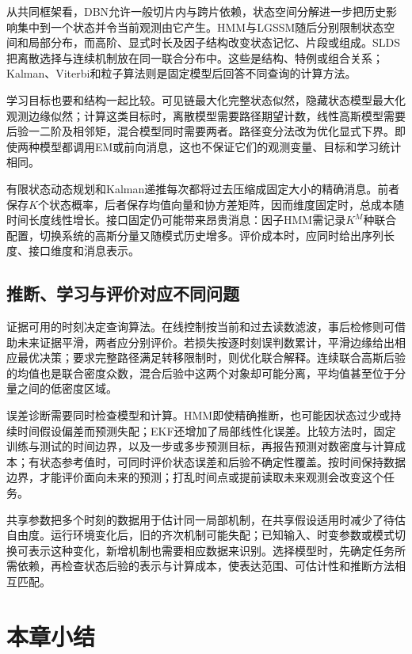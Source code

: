从共同框架看，DBN允许一般切片内与跨片依赖，状态空间分解进一步把历史影响集中到一个状态并令当前观测由它产生。HMM与LGSSM随后分别限制状态空间和局部分布，而高阶、显式时长及因子结构改变状态记忆、片段或组成。SLDS把离散选择与连续机制放在同一联合分布中。这些是结构、特例或组合关系；Kalman、Viterbi和粒子算法则是固定模型后回答不同查询的计算方法。

学习目标也要和结构一起比较。可见链最大化完整状态似然，隐藏状态模型最大化观测边缘似然；计算这类目标时，离散模型需要路径期望计数，线性高斯模型需要后验一二阶及相邻矩，混合模型同时需要两者。路径变分法改为优化显式下界。即使两种模型都调用EM或前向消息，这也不保证它们的观测变量、目标和学习统计相同。

有限状态动态规划和Kalman递推每次都将过去压缩成固定大小的精确消息。前者保存$K$个状态概率，后者保存均值向量和协方差矩阵，因而维度固定时，总成本随时间长度线性增长。接口固定仍可能带来昂贵消息：因子HMM需记录$K^M$种联合配置，切换系统的高斯分量又随模式历史增多。评价成本时，应同时给出序列长度、接口维度和消息表示。

\subsection{推断、学习与评价对应不同问题}
\label{sec:pgm-dynamic-evaluation}

证据可用的时刻决定查询算法。在线控制按当前和过去读数滤波，事后检修则可借助未来证据平滑，两者应分别评价。若损失按逐时刻误判数累计，平滑边缘给出相应最优决策；要求完整路径满足转移限制时，则优化联合解释。连续联合高斯后验的均值也是联合密度众数，混合后验中这两个对象却可能分离，平均值甚至位于分量之间的低密度区域。

误差诊断需要同时检查模型和计算。HMM即使精确推断，也可能因状态过少或持续时间假设偏差而预测失配；EKF还增加了局部线性化误差。比较方法时，固定训练与测试的时间边界，以及一步或多步预测目标，再报告预测对数密度与计算成本；有状态参考值时，可同时评价状态误差和后验不确定性覆盖。按时间保持数据边界，才能评价面向未来的预测；打乱时间点或提前读取未来观测会改变这个任务。

共享参数把多个时刻的数据用于估计同一局部机制，在共享假设适用时减少了待估自由度。运行环境变化后，旧的齐次机制可能失配；已知输入、时变参数或模式切换可表示这种变化，新增机制也需要相应数据来识别。选择模型时，先确定任务所需依赖，再检查状态后验的表示与计算成本，使表达范围、可估计性和推断方法相互匹配。

\section{本章小结}
\label{sec:pgm-dynamic-summary}

